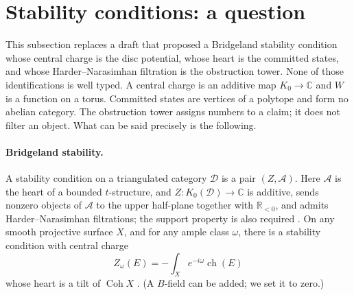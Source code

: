 \documentclass[11pt]{article}
\theoremstyle{definition}
\theoremstyle{remark}
\begin{document}
\section{Stability conditions: a question}\label{sec:stability}

This subsection replaces a draft that proposed a Bridgeland stability condition whose central charge
is the disc potential, whose heart is the committed states, and whose Harder--Narasimhan filtration
is the obstruction tower. None of those identifications is well typed. A central charge is an additive
map $K_0\to\mathbb{C}$ and $W$ is a function on a torus. Committed states are vertices of a polytope
and form no abelian category. The obstruction tower assigns numbers to a claim; it does not
filter an object. What can be said precisely is the following.

\paragraph{Bridgeland stability.} A stability condition on a triangulated category $\mathcal D$ is a
pair $(Z,\mathcal A)$. Here $\mathcal A$ is the heart of a bounded $t$-structure, and
$Z\colon K_0(\mathcal D)\to\mathbb{C}$ is additive, sends nonzero objects of $\mathcal A$ to the upper
half-plane together with $\mathbb{R}_{<0}$, and admits Harder--Narasimhan filtrations; the support
property is also required \cite{Bridgeland2007}. On any smooth projective surface $X$, and for
any ample class $\omega$, there is a stability condition with central charge
\[
Z_\omega(E)=-\int_Xe^{-i\omega}\operatorname{ch}(E)
\]
whose heart is a tilt of $\operatorname{Coh}X$ \cite{ArcaraBertram2013,MacriSchmidt2017}. (A $B$-field
can be added; we set it to zero.)
\end{document}
